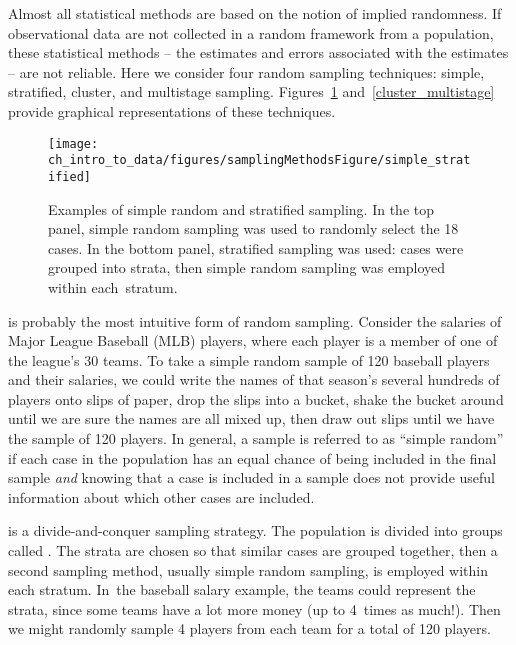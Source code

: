 Almost all statistical methods are based on the notion of implied randomness. If observational data are not collected in a random framework from a population, these statistical methods -- the estimates and errors associated with the estimates -- are not reliable. Here we consider four random sampling techniques: simple, stratified, cluster, and multistage sampling. Figures~\ref{simple_stratified} and~\ref{cluster_multistage} provide graphical representations of these techniques.

\begin{figure}
\centering
\texttt{[image: ch\_intro\_to\_data/figures/samplingMethodsFigure/simple\_stratified]}
\caption{Examples of simple random and stratified sampling. In the top panel, simple random sampling was used to randomly select the 18 cases. In the bottom panel, stratified sampling was used: cases were grouped into strata, then simple random sampling was employed within \mbox{each stratum}.}
\label{simple_stratified}
\end{figure}

 is probably the most intuitive form of random sampling. Consider the salaries of Major League Baseball (MLB) players, where each player is a member of one of the league's 30 teams. To take a simple random sample of 120 baseball players and their salaries, we could write the names of that season's several hundreds of players onto slips of paper, drop the slips into a bucket, shake the bucket around until we are sure the names are all mixed up, then draw out slips until we have the sample of 120 players. In general, a sample is referred to as ``simple random'' if each case in the population has an equal chance of being included in the final sample \emph{and} knowing that a case is included in a sample does not provide useful information about which other cases are included.

is a divide-and-conquer sampling strategy.
The population is divided into groups called
.
The strata are chosen so that similar cases are grouped
together, then a second sampling method, usually simple
random sampling, is employed within each stratum.
In~the baseball salary example, the teams could represent
the strata, since some teams have a lot more money
(up to 4~times as much!).
Then we might randomly sample 4 players from each team for
a total of 120 players.


